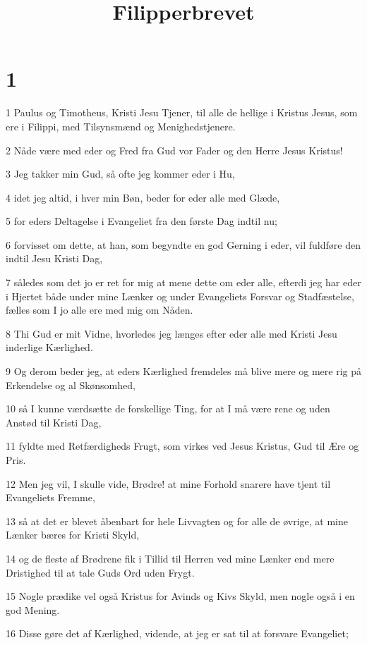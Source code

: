

\title{Filipperbrevet}


\chapter{1}

\par 1 Paulus og Timotheus, Kristi Jesu Tjener, til alle de hellige i Kristus Jesus, som ere i Filippi, med Tilsynsmænd og Menighedstjenere.
\par 2 Nåde være med eder og Fred fra Gud vor Fader og den Herre Jesus Kristus!
\par 3 Jeg takker min Gud, så ofte jeg kommer eder i Hu,
\par 4 idet jeg altid, i hver min Bøn, beder for eder alle med Glæde,
\par 5 for eders Deltagelse i Evangeliet fra den første Dag indtil nu;
\par 6 forvisset om dette, at han, som begyndte en god Gerning i eder, vil fuldføre den indtil Jesu Kristi Dag,
\par 7 således som det jo er ret for mig at mene dette om eder alle, efterdi jeg har eder i Hjertet både under mine Lænker og under Evangeliets Forsvar og Stadfæstelse, fælles som I jo alle ere med mig om Nåden.
\par 8 Thi Gud er mit Vidne, hvorledes jeg længes efter eder alle med Kristi Jesu inderlige Kærlighed.
\par 9 Og derom beder jeg, at eders Kærlighed fremdeles må blive mere og mere rig på Erkendelse og al Skønsomhed,
\par 10 så I kunne værdsætte de forskellige Ting, for at I må være rene og uden Anstød til Kristi Dag,
\par 11 fyldte med Retfærdigheds Frugt, som virkes ved Jesus Kristus, Gud til Ære og Pris.
\par 12 Men jeg vil, I skulle vide, Brødre! at mine Forhold snarere have tjent til Evangeliets Fremme,
\par 13 så at det er blevet åbenbart for hele Livvagten og for alle de øvrige, at mine Lænker bæres for Kristi Skyld,
\par 14 og de fleste af Brødrene fik i Tillid til Herren ved mine Lænker end mere Dristighed til at tale Guds Ord uden Frygt.
\par 15 Nogle prædike vel også Kristus for Avinds og Kivs Skyld, men nogle også i en god Mening.
\par 16 Disse gøre det af Kærlighed, vidende, at jeg er sat til at forsvare Evangeliet;
